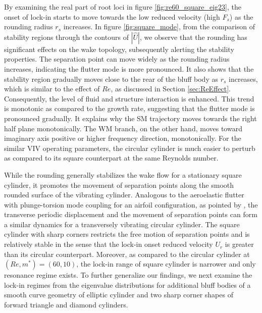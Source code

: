 \documentclass{jfm}
\begin{document}
By examining the real part of root loci in figure \ref{fig:re60_square_eig23}, 
the onset of lock-in starts to move
towards the low reduced velocity (high $F_s$) as the rounding radius $r_s$ increases. 
%
In figure \ref{fig:square_mode}, from the comparison of stability regions through the contours 
of $|\widehat{U}|$, we observe that the rounding has significant 
effects on the wake topology, 
subsequently alerting the stability properties. 
The separation point can move widely as the rounding radius increases, indicating the flutter 
mode is more pronounced. 
%
It also shows that the stability region gradually moves close to the rear of the bluff body as 
$r_s$ increases, which is similar to the effect of $Re$, as discussed in 
Section \ref{sec:ReEffect}. Consequently, the level of 
fluid and structure interaction is enhanced.
%
This trend is monotonic as compared to the growth rate, suggesting
that the flutter mode is pronounced gradually. It explains why the SM trajectory moves towards 
the right half plane monotonically.
%
The WM branch, on the other hand, moves toward imaginary axis positive or 
higher frequency direction, monotonically.
%
For the similar VIV operating parameters, 
the circular cylinder is much easier to perturb as compared to its square counterpart 
at the same Reynolds number. 

While the rounding generally stabilizes 
the wake flow for a stationary square cylinder,  
it promotes the movement of separation points along the smooth rounded surface 
of the vibrating cylinder.
Analogous to the aeroelastic flutter with 
plunge-torsion mode coupling for an airfoil configuration, as pointed by \cite{DeLangre2006}, 
the transverse periodic displacement and the movement of separation points can form a 
similar dynamics for a transversely vibrating circular cylinder.
The square cylinder with sharp corners restricts the free motion of separation points 
and is relatively stable in the sense that the lock-in onset reduced velocity $U_r$ 
is greater than its circular counterpart. 
Moreover, as compared to the circular cylinder at $(Re,m^*)=(60,10)$, 
the lock-in range of square cylinder is narrower and only resonance regime exists. 
%
To further generalize our findings, 
we next examine the lock-in regimes from the eigenvalue distributions for additional bluff bodies 
of a smooth curve geometry of elliptic cylinder and two sharp corner shapes of 
forward triangle and diamond cylinders.
%
\end{document}
